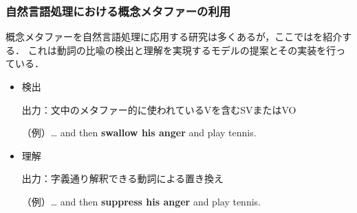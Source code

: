 \documentclass[11pt]{beamer}
\newlength{\la}
\let\oldcite=\citet
\renewcommand\citet[1]{\hyperlink{#1}{\oldcite{#1}}}
\newcommand\metaphorical[1]{\textcolor{sRed}{\textbf{#1}}}
\begin{document}
\begin{frame}
\frametitle{自然言語処理における概念メタファーの利用}
概念メタファーを自然言語処理に応用する研究は多くあるが，ここでは\citet{shutova2013}を紹介する．
これは動詞の比喩の検出と理解を実現するモデルの提案とその実装を行っている．
\begin{itemize}
    \item 検出

        出力：文中のメタファー的に使われているVを含むSVまたはVO


        （例）… and then \textbf{\metaphorical{swallow} his anger} and play tennis.

    \item 理解

        出力：字義通り解釈できる動詞による置き換え

        （例）… and then \textbf{\textcolor{sDarkBlue}{suppress} his anger} and play tennis.
\end{itemize}

\end{frame}
\end{document}
